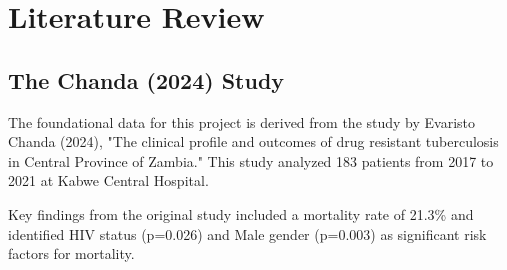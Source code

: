 \chapter{Literature Review}
\section{The Chanda (2024) Study}
The foundational data for this project is derived from the study by Evaristo Chanda (2024), "The clinical profile and outcomes of drug resistant tuberculosis in Central Province of Zambia." This study analyzed 183 patients from 2017 to 2021 at Kabwe Central Hospital.

Key findings from the original study included a mortality rate of 21.3\% and identified HIV status (p=0.026) and Male gender (p=0.003) as significant risk factors for mortality.
